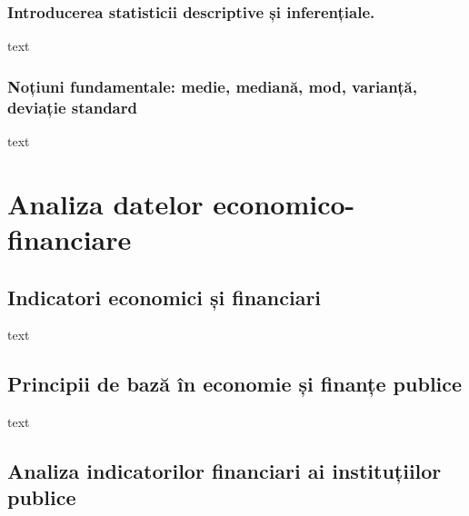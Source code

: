 \documentclass[
  11pt,
  b5paper,
  nottoc]{book}
\begin{document}
\hypertarget{introducerea-statisticii-descriptive-ux219i-inferenux21biale.}{%
\subsection{Introducerea statisticii descriptive și
inferențiale.}\label{introducerea-statisticii-descriptive-ux219i-inferenux21biale.}}

text

\hypertarget{noux21biuni-fundamentale-medie-medianux103-mod-varianux21bux103-deviaux21bie-standard}{%
\subsection{Noțiuni fundamentale: medie, mediană, mod, varianță,
deviație
standard}\label{noux21biuni-fundamentale-medie-medianux103-mod-varianux21bux103-deviaux21bie-standard}}

text


\hypertarget{cap4}{%
\chapter{Analiza datelor economico-financiare}\label{cap4}}

\hypertarget{indicatori-economici-ux219i-financiari}{%
\section{Indicatori economici și
financiari}\label{indicatori-economici-ux219i-financiari}}

text

\hypertarget{principii-de-bazux103-uxeen-economie-ux219i-finanux21be-publice}{%
\section{Principii de bază în economie și finanțe
publice}\label{principii-de-bazux103-uxeen-economie-ux219i-finanux21be-publice}}

text

\hypertarget{analiza-indicatorilor-financiari-ai-instituux21biilor-publice}{%
\section{Analiza indicatorilor financiari ai instituțiilor
publice}\label{analiza-indicatorilor-financiari-ai-instituux21biilor-publice}}
\end{document}
